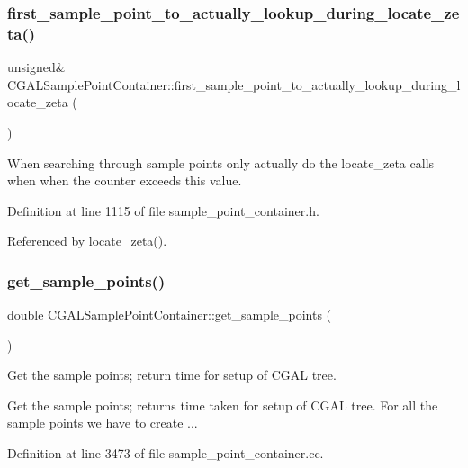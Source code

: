 \subsubsection{\texorpdfstring{first\+\_\+sample\+\_\+point\+\_\+to\+\_\+actually\+\_\+lookup\+\_\+during\+\_\+locate\+\_\+zeta()}{first\_sample\_point\_to\_actually\_lookup\_during\_locate\_zeta()}}
{\footnotesize\ttfamily unsigned\& C\+G\+A\+L\+Sample\+Point\+Container\+::first\+\_\+sample\+\_\+point\+\_\+to\+\_\+actually\+\_\+lookup\+\_\+during\+\_\+locate\+\_\+zeta (\begin{DoxyParamCaption}{ }\end{DoxyParamCaption})\hspace{0.3cm}{\ttfamily [inline]}}



When searching through sample points only actually do the locate\+\_\+zeta calls when when the counter exceeds this value. 



Definition at line 1115 of file sample\+\_\+point\+\_\+container.\+h.



Referenced by locate\+\_\+zeta().

\mbox{\label{classCGALSamplePointContainer_a9986b13f78a4f22113a2e41b85b73ee3}} 
\subsubsection{\texorpdfstring{get\+\_\+sample\+\_\+points()}{get\_sample\_points()}}
{\footnotesize\ttfamily double C\+G\+A\+L\+Sample\+Point\+Container\+::get\+\_\+sample\+\_\+points (\begin{DoxyParamCaption}{ }\end{DoxyParamCaption})\hspace{0.3cm}{\ttfamily [private]}}



Get the sample points; return time for setup of C\+G\+AL tree. 

Get the sample points; returns time taken for setup of C\+G\+AL tree. For all the sample points we have to create ... 

Definition at line 3473 of file sample\+\_\+point\+\_\+container.\+cc.



